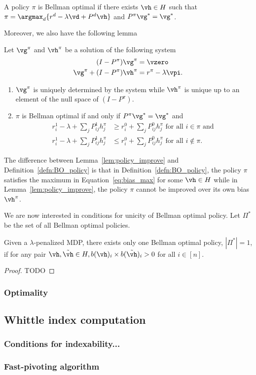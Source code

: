 \begin{defn}
\label{defn:BO_policy}
A policy $\pi$ is Bellman optimal if there exists $\vh\in H$ such that $\pi=\argmax_d\{r^d -\lambda \vd +P^d\vh\}$ and $P^\pi\vg^*=\vg^*$.
\end{defn}

Moreover, we also have the following lemma
\begin{lem}
    \label{lem:policy_improve}
    Let $\vg^\pi$ and $\vh^\pi$ be a solution of the following system
    \begin{align}
        (I-P^\pi)\vg^\pi &=\vzero \label{eq:gain_eval}\\
        \vg^\pi +(I-P^\pi)\vh^\pi &= r^\pi -\lambda\vpi \label{eq:bias_eval}.
    \end{align}
    \begin{enumerate}
        \item $\vg^\pi$ is uniquely determined by the system while $\vh^\pi$ is unique up to an element of the null space of $(I-P^\pi)$.
        \item $\pi$ is Bellman optimal if and only if $P^\pi\vg^*=\vg^*$ and
            \begin{align*}
                r^1_i-\lambda +\sum_{j}P^1_{ij}h^\pi_j &\ge r^0_i +\sum_{j}P^0_{ij}h^\pi_j \text{ for all } i\in\pi \text{ and } \\
                r^1_i-\lambda +\sum_{j}P^1_{ij}h^\pi_j &\le r^0_i +\sum_{j}P^0_{ij}h^\pi_j \text{ for all } i\notin\pi.
        \end{align*}
    \end{enumerate}
\end{lem}
The difference between Lemma~\ref{lem:policy_improve} and Definition~\ref{defn:BO_policy} is that in Definition~\ref{defn:BO_policy}, the policy $\pi$ satisfies the maximum in Equation~\eqref{eq:bias_max} for some $\vh\in H$ while in Lemma~\ref{lem:policy_improve}, the policy $\pi$ cannot be improved over its own bias $\vh^\pi$.

We are now interested in conditions for unicity of Bellman optimal policy.
Let $\Pi^*$ be the set of all Bellman optimal policies. 

\begin{lem}
\label{lem:unicity_BO}
Given a $\lambda$-penalized MDP, there exists only one Bellman optimal policy, $|\Pi^*|=1$, if for any pair $\vh, \tilde{\vh}\in H, b(\vh)_i\times b(\tilde{\vh})_i>0$ for all $i\in[n]$.
\end{lem}
\begin{proof}
    TODO
\end{proof}

\subsubsection{Optimality}

\subsection{Whittle index computation}

\subsubsection{Conditions for indexability...}

\subsubsection{Fast-pivoting algorithm}

